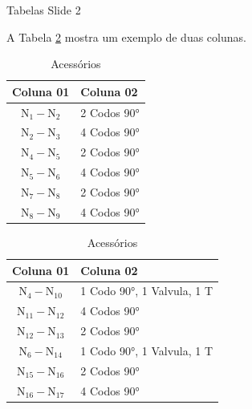 \documentclass{beamer}
\begin{document}
\begin{frame}{Tabelas Slide 2}

    A Tabela \ref{Tab:Accesorios} mostra um exemplo de duas colunas.
    
    \begin{table}[htbp]
        \centering
        \caption{Acessórios}
        \vspace{-\baselineskip}
        \label{Tab:Accesorios}
        \null\hfill
        \scriptsize
        \begin{tabular}{cl}
        \toprule
        \textbf{Coluna 01} & \textbf{Coluna 02} \\
        \midrule
        $\text{N}_{1}-\text{N}_{2}$ & 2 Codos 90°\\
        $\text{N}_{2}-\text{N}_{3}$ & 4 Codos 90° \\ 
        
        $\text{N}_{4}-\text{N}_{5}$ & 2 Codos 90° \\ 
        $\text{N}_{5}-\text{N}_{6}$ & 4 Codos 90° \\ 
        
        $\text{N}_{7}-\text{N}_{8}$ & 2 Codos 90° \\
        $\text{N}_{8}-\text{N}_{9}$ & 4 Codos 90° \\ 
        \bottomrule
        \end{tabular}
        \hfill\hfill
        \begin{tabular}{cl}
        \toprule
        \textbf{Coluna 01} & \textbf{Coluna 02} \\
        \midrule
        $\text{N}_{4}-\text{N}_{10}$ & 1 Codo 90°, 1 Valvula, 1 T \\ 
        
        $\text{N}_{11}-\text{N}_{12}$ & 4 Codos 90° \\ 
        $\text{N}_{12}-\text{N}_{13}$ & 2 Codos 90° \\ 
        $\text{N}_{6}-\text{N}_{14}$ & 1 Codo 90°, 1 Valvula, 1 T \\ 
        
        $\text{N}_{15}-\text{N}_{16}$ & 2 Codos 90° \\ 
        $\text{N}_{16}-\text{N}_{17}$ & 4 Codos 90° \\ 
        \bottomrule
        \end{tabular}
        \hfill\null
    \end{table}
    
\end{frame}
\end{document}
